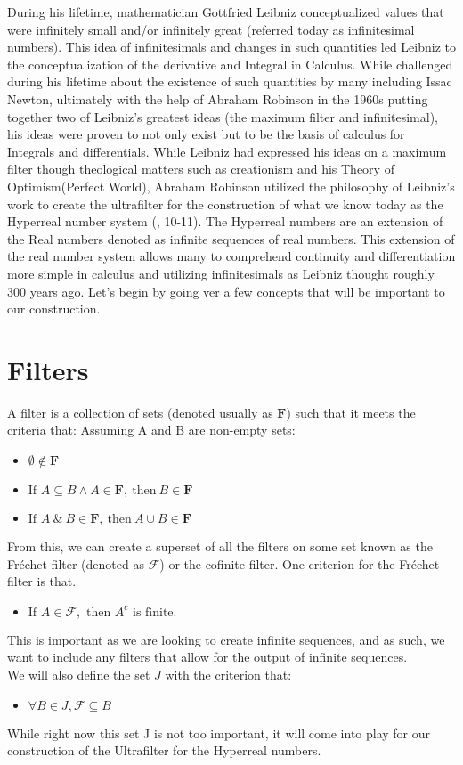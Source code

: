 \documentclass[12pt]{report}
\begin{document}
During his lifetime, mathematician Gottfried Leibniz conceptualized values that were infinitely small and/or infinitely great (referred today as infinitesimal numbers).
This idea of infinitesimals and changes in such quantities led Leibniz to the conceptualization of the derivative and Integral in Calculus. 
While challenged during his lifetime about the existence of such quantities by many including Issac Newton, ultimately with the help of Abraham Robinson in the 1960s putting together two of Leibniz's greatest ideas (the maximum filter and infinitesimal), his ideas were proven to not only exist but to be the basis of calculus for Integrals and differentials. 
While Leibniz had expressed his ideas on a maximum filter though theological matters such as creationism and his Theory of Optimism(Perfect World), Abraham Robinson utilized the philosophy of Leibniz's work to create the ultrafilter for the construction of what we know today as the Hyperreal number system (\citeauthor{Goldblatt}, 10-11).
The Hyperreal numbers are an extension of the Real numbers denoted as infinite sequences of real numbers. 
This extension of the real number system allows many to comprehend continuity and differentiation more simple in calculus and utilizing infinitesimals as Leibniz thought  roughly 300 years ago.
Let's begin by going ver a few concepts that will be important to our construction.

\section*{Filters}
A filter is a collection of sets (denoted usually as $\mathbf{F}$) such that it meets the criteria that:
Assuming A and B are non-empty sets:
\begin{itemize}
    \item $\emptyset \not\in \mathbf{F}$
    \item $\text{If }  A \subseteq B \land A  \in \mathbf{F} ,\ \text{then} \ B \in \mathbf{F} $
    \item $\text{If }  A \ \& \ B  \in \mathbf{F} ,\ \text{then}  \ A \cup B \in \mathbf{F} $
\end{itemize}
From this, we can create a superset of all the filters on some set known as the Fr\'echet filter (denoted as $\mathcal{F}$) or the cofinite filter.
One criterion for the Fr\'echet filter is that.
\begin{itemize}
    \item $\text{If } A \in \mathcal{F}, \text{ then } A^c \text{ is finite.}$
\end{itemize}
This is important as we are looking to create infinite sequences, and as such, we want to include any filters that allow for the output of infinite sequences.\\
We will also define the set $J$ with the criterion that:
\begin{itemize}
    \item $\forall B \in J, \mathcal{F} \subseteq B$
\end{itemize}
While right now this set J is not too important, it will come into play for our construction of the Ultrafilter for the Hyperreal numbers.
\end{document}
